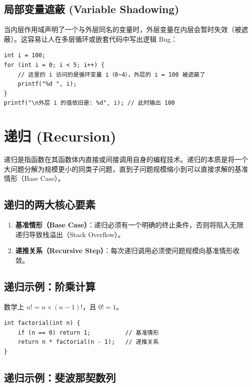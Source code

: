 \subsection{局部变量遮蔽 (Variable Shadowing)}

当内层作用域声明了一个与外层同名的变量时，外层变量在内层会暂时失效（被遮蔽）。这容易让人在多层循环或嵌套代码中写出逻辑 Bug：

\begin{lstlisting}[caption={变量遮蔽示例}]
int i = 100;
for (int i = 0; i < 5; i++) {
    // 这里的 i 访问的是循环变量 i（0~4），外层的 i = 100 被遮蔽了
    printf("%d ", i); 
}
printf("\n外层 i 的值依旧是: %d", i); // 此时输出 100
\end{lstlisting}

\newpage

\section{递归 (Recursion)}

递归是指函数在其函数体内直接或间接调用自身的编程技术。递归的本质是将一个大问题分解为规模更小的同类子问题，直到子问题规模缩小到可以直接求解的基准情形（Base Case）。

\subsection{递归的两大核心要素}

\begin{enumerate}
    \item \textbf{基准情形（Base Case）}：递归必须有一个明确的终止条件，否则将陷入无限递归导致栈溢出（Stack Overflow）。
    \item \textbf{递推关系（Recursive Step）}：每次递归调用必须使问题规模向基准情形收敛。
\end{enumerate}

\subsection{递归示例：阶乘计算}

数学上 $n! = n \times (n-1)!$，且 $0! = 1$。

\begin{lstlisting}[caption={递归实现阶乘}]
int factorial(int n) {
    if (n == 0) return 1;          // 基准情形
    return n * factorial(n - 1);   // 递推关系
}
\end{lstlisting}

\subsection{递归示例：斐波那契数列}

